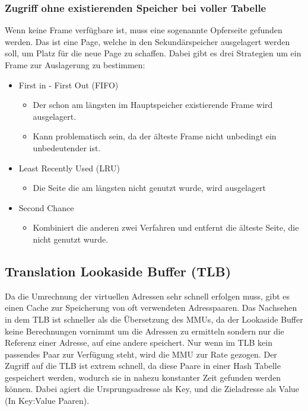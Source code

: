 \documentclass{article}
\begin{document}
	\subsubsection{Zugriff ohne existierenden Speicher bei voller Tabelle}
	Wenn keine Frame verfügbare ist, muss eine sogenannte Opferseite gefunden werden. Das ist eine Page, welche in den Sekundärspeicher ausgelagert werden soll, um Platz für die neue Page zu schaffen. Dabei gibt es drei Strategien um ein Frame zur Auslagerung zu bestimmen:
	\begin{itemize}
		\item{First in - First Out (FIFO)}
		\begin{itemize}
			\item{Der schon am längsten im Hauptspeicher existierende Frame wird ausgelagert.}
			\item{Kann problematisch sein, da der älteste Frame nicht unbedingt ein unbedeutender ist.}
		\end{itemize}
		\item{Least Recently Used (LRU)}
		\begin{itemize}
			\item{Die Seite die am längsten nicht genutzt wurde, wird ausgelagert}
		\end{itemize}
		\item{Second Chance}
		\begin{itemize}
			\item{Kombiniert die anderen zwei Verfahren und entfernt die älteste Seite, die nicht genutzt wurde.}
		\end{itemize}
	\end{itemize}
	\subsection{Translation Lookaside Buffer (TLB)}
	Da die Umrechnung der virtuellen Adressen sehr schnell erfolgen muss, gibt es einen Cache zur Speicherung von oft verwendeten Adresspaaren. Das Nachsehen in dem TLB ist schneller als die Übersetzung des MMUs, da der Lookaside Buffer keine Berechnungen vornimmt um die Adressen zu ermitteln sondern nur die Referenz einer Adresse, auf eine andere speichert. Nur wenn im TLB kein passendes Paar zur Verfügung steht, wird die MMU zur Rate gezogen. Der Zugriff auf die TLB ist extrem schnell, da diese Paare in einer Hash Tabelle gespeichert werden, wodurch sie in nahezu konstanter Zeit gefunden werden können. Dabei agiert die Ursprungsadresse als Key, und die Zieladresse als Value (In Key:Value Paaren).
\end{document}
